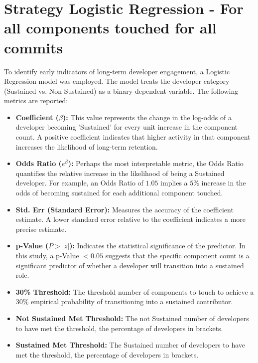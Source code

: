 \section{Strategy Logistic Regression - For all components touched for all commits } 
\label{sec:codebase_graph_latex.repository_graph.component_time_series.strategy_logistic_regressionall commits } 

To identify early indicators of long-term developer engagement, a Logistic Regression model was employed. The model treats the developer category (Sustained vs. Non-Sustained) as a binary dependent variable. The following metrics are reported:

\begin{itemize}
    \item \textbf{Coefficient ($\beta$):} This value represents the change in the log-odds of a developer becoming 'Sustained' for every unit increase in the component count. A positive coefficient indicates that higher activity in that component increases the likelihood of long-term retention.
    \item \textbf{Odds Ratio ($e^\beta$):} Perhaps the most interpretable metric, the Odds Ratio quantifies the relative increase in the likelihood of being a Sustained developer. For example, an Odds Ratio of $1.05$ implies a $5\%$ increase in the odds of becoming sustained for each additional component touched.
    \item \textbf{Std. Err (Standard Error):} Measures the accuracy of the coefficient estimate. A lower standard error relative to the coefficient indicates a more precise estimate.
    \item \textbf{p-Value ($P>|z|$):} Indicates the statistical significance of the predictor. In this study, a p-Value $< 0.05$ suggests that the specific component count is a significant predictor of whether a developer will transition into a sustained role.
    \item \textbf{30\% Threshold:} The threshold number of components to touch to achieve a 30\% empirical probability of transitioning into a sustained contributor.
    \item \textbf{Not Sustained Met Threshold:} The not Sustained number of developers to have met the threshold, the percentage of developers in brackets.
    \item \textbf{Sustained Met Threshold:} The Sustained number of developers to have met the threshold, the percentage of developers in brackets.
\end{itemize}

